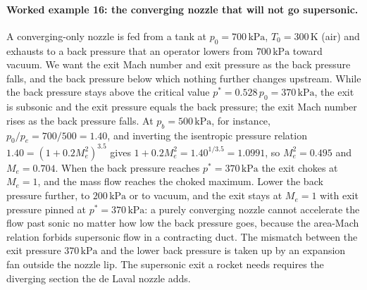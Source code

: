 \paragraph{Worked example 16: the converging nozzle that will not go
supersonic.} A converging-only nozzle is fed from a tank at
$p_0 = 700\,\text{kPa}$, $T_0 = 300\,\si{\kelvin}$ (air) and exhausts
to a back pressure that an operator lowers from $700\,\text{kPa}$
toward vacuum. We want the exit Mach number and exit pressure as the
back pressure falls, and the back pressure below which nothing further
changes upstream. While the back pressure stays above the critical
value $p^* = 0.528\,p_0 = 370\,\text{kPa}$, the exit is subsonic and
the exit pressure equals the back pressure; the exit Mach number rises
as the back pressure falls. At $p_b = 500\,\text{kPa}$, for instance,
$p_0/p_e = 700/500 = 1.40$, and inverting the isentropic pressure
relation $1.40 = (1 + 0.2 M_e^2)^{3.5}$ gives $1 + 0.2 M_e^2 =
1.40^{1/3.5} = 1.0991$, so $M_e^2 = 0.495$ and $M_e = 0.704$. When the
back pressure reaches $p^* = 370\,\text{kPa}$ the exit chokes at
$M_e = 1$, and the mass flow reaches the choked maximum. Lower the back
pressure further, to $200\,\text{kPa}$ or to vacuum, and the exit stays
at $M_e = 1$ with exit pressure pinned at $p^* = 370\,\text{kPa}$: a
purely converging nozzle cannot accelerate the flow past sonic no
matter how low the back pressure goes, because the area-Mach relation
forbids supersonic flow in a contracting duct. The mismatch between the
exit pressure $370\,\text{kPa}$ and the lower back pressure is taken up
by an expansion fan outside the nozzle lip. The supersonic exit a
rocket needs requires the diverging section the de Laval nozzle adds.

